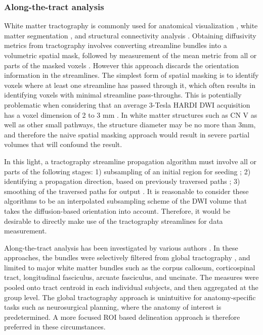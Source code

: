 \subsubsection{Along-the-tract analysis}
White matter tractography is commonly used for anatomical visualization \cite{Chen2011b}, white matter segmentation \cite{Behrens2003a,Johansen-Berg2005}, and structural connectivity analysis \cite{Cao2013,Wiech2014}. Obtaining diffusivity metrics from tractography involves converting streamline bundles into a volumetric spatial mask, followed by measurement of the mean metric from all or parts of the masked voxels \cite{Concha2005,Fitzsimmons2009}. However this approach discards the orientation information in the streamlines. The simplest form of spatial masking is to identify voxels where at least one streamline has passed through it, which often results in identifying voxels with minimal streamline pass-throughs. This is potentially problematic when considering that an average 3-Tesla HARDI DWI acquisition has a voxel dimension of 2 to 3 mm \cite{Neher2015,Wilkins2015}. In white matter structures such as CN V as well as other small pathways, the structure diameter may be no more than 3mm, and therefore the naive spatial masking approach would result in severe partial volumes that will confound the result. 

In this light, a tractography streamline propagation algorithm must involve all or parts of the following stages: 1) subsampling of an initial region for seeding \cite{Basser2002,Cote2012}; 2) identifying a propagation direction, based on previously traversed paths \cite{Malcolm2010,Qazi2009,Tournier2010}; 3) smoothing of the traversed paths for output \cite{Tuch2000d}. It is reasonable to consider these algorithms to be an interpolated subsampling scheme of the DWI volume that takes the diffusion-based orientation into account. Therefore, it would be desirable to directly make use of the tractography streamlines for data measurement. 

Along-the-tract analysis has been investigated by various authors \cite{Colby2012,ODonnell2009,Wang2015,Yeatman2012}. In these approaches, the bundles were selectively filtered from global tractography \cite{Wang2015,Yeatman2012}, and limited to major white matter bundles such as the corpus callosum, corticospinal tract, longitudinal fasciculus, arcuate fasciculus, and uncinate. The measures were pooled onto tract centroid in each individual subjects, and then aggregated at the group level. The global tractography approach is unintuitive for anatomy-specific tasks such as neurosurgical planning, where the anatomy of interest is predetermined. A more focused ROI based delineation approach is therefore preferred in these circumstances.

